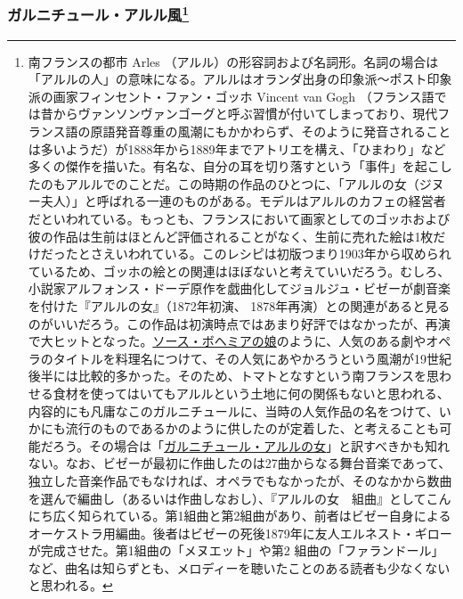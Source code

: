 \begin{recette}
\hypertarget{garniture-arlesienne}{%
\subsubsection[ガルニチュール・アルル風]{\texorpdfstring{ガルニチュール・アルル風\footnote{南フランスの都市
  Arles
  （アルル）の形容詞および名詞形。名詞の場合は「アルルの人」の意味になる。アルルはオランダ出身の印象派〜ポスト印象派の画家フィンセント・ファン・ゴッホ
  Vincent van Gogh
  （フランス語では昔からヴァンソンヴァンゴーグと呼ぶ習慣が付いてしまっており、現代フランス語の原語発音尊重の風潮にもかかわらず、そのように発音されることは多いようだ）が1888年から1889年までアトリエを構え、「ひまわり」など多くの傑作を描いた。有名な、自分の耳を切り落すという「事件」を起こしたのもアルルでのことだ。この時期の作品のひとつに、「アルルの女（ジヌー夫人）」と呼ばれる一連のものがある。モデルはアルルのカフェの経営者だといわれている。もっとも、フランスにおいて画家としてのゴッホおよび彼の作品は生前はほとんど評価されることがなく、生前に売れた絵は1枚だけだったとさえいわれている。このレシピは初版つまり1903年から収められているため、ゴッホの絵との関連はほぼないと考えていいだろう。むしろ、小説家アルフォンス・ドーデ原作を戯曲化してジョルジュ・ビゼーが劇音楽を付けた『アルルの女』（1872年初演、
  1878年再演）との関連があると見るのがいいだろう。この作品は初演時点ではあまり好評ではなかったが、再演で大ヒットとなった。\protect\hyperlink{sauce-bohemienne}{ソース・ボヘミアの娘}のように、人気のある劇やオペラのタイトルを料理名につけて、その人気にあやかろうという風潮が19世紀後半には比較的多かった。そのため、トマトとなすという南フランスを思わせる食材を使ってはいてもアルルという土地に何の関係もないと思われる、内容的にも凡庸なこのガルニチュールに、当時の人気作品の名をつけて、いかにも流行のものであるかのように供したのが定着した、と考えることも可能だろう。その場合は「\ul{ガルニチュール・アルルの女}」と訳すべきかも知れない。なお、ビゼーが最初に作曲したのは27曲からなる舞台音楽であって、独立した音楽作品でもなければ、オペラでもなかったが、そのなかから数曲を選んで編曲し（あるいは作曲しなおし）、『アルルの女　組曲』としてこんにち広く知られている。第1組曲と第2組曲があり、前者はビゼー自身によるオーケストラ用編曲。後者はビゼーの死後1879年に友人エルネスト・ギローが完成させた。第1組曲の「メヌエット」や第2
  組曲の「ファランドール」など、曲名は知らずとも、メロディーを聴いたことのある読者も少なくないと思われる。}}{ガルニチュール・アルル風}}\label{garniture-arlesienne}}




\end{recette}

